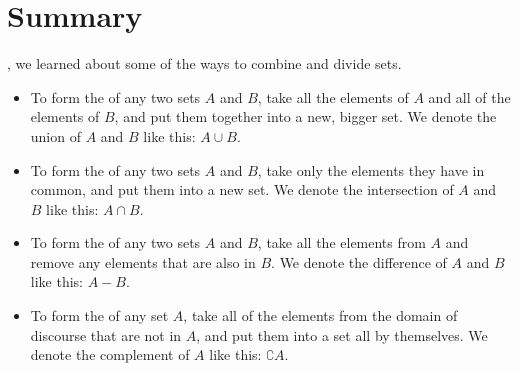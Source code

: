 \documentclass[../../../main.tex]{subfiles}
\begin{document}
\section{Summary}

, we learned about some of the ways to combine and divide sets. 

\begin{itemize}

  \item To form the  of any two sets $A$ and $B$, take all the elements of $A$ and all of the elements of $B$, and put them together into a new, bigger set. We denote the union of $A$ and $B$ like this: $A \cup B$.
  
  \item To form the  of any two sets $A$ and $B$, take only the elements they have in common, and put them into a new set. We denote the intersection of $A$ and $B$ like this: $A \cap B$.
  
  \item To form the  of any two sets $A$ and $B$, take all the elements from $A$ and remove any elements that are also in $B$. We denote the difference of $A$ and $B$ like this: $A - B$.
  
  \item To form the  of any set $A$, take all of the elements from the domain of discourse that are not in $A$, and put them into a set all by themselves. We denote the complement of $A$ like this: $\complement{A}$.

\end{itemize}
\end{document}

